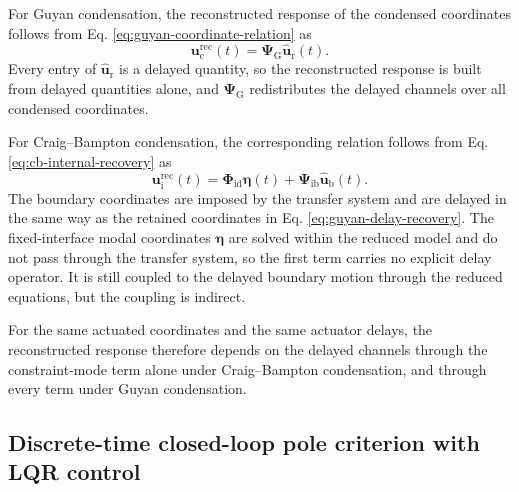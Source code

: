 \documentclass[11pt,a4paper]{article}
\numberwithin{equation}{section}
\begin{document}
For Guyan condensation, the reconstructed response of the condensed coordinates follows from Eq. \eqref{eq:guyan-coordinate-relation} as
\begin{equation}
	\bm{u}_{\mathrm{c}}^{\mathrm{rec}}(t)=\bm{\Psi}_{\mathrm{G}}\hat{\bm{u}}_{\mathrm{r}}(t).
	\label{eq:guyan-delay-recovery}
\end{equation}
Every entry of \(\hat{\bm{u}}_{\mathrm{r}}\) is a delayed quantity, so the reconstructed response is built from delayed quantities alone, and \(\bm{\Psi}_{\mathrm{G}}\) redistributes the delayed channels over all condensed coordinates.

For Craig--Bampton condensation, the corresponding relation follows from Eq. \eqref{eq:cb-internal-recovery} as
\begin{equation}
	\bm{u}_{\mathrm{i}}^{\mathrm{rec}}(t)=
	\bm{\Phi}_{\mathrm{id}}\bm{\eta}(t)
	+\bm{\Psi}_{\mathrm{ib}}\hat{\bm{u}}_{\mathrm{b}}(t).
	\label{eq:cb-delay-recovery}
\end{equation}
The boundary coordinates are imposed by the transfer system and are delayed in the same way as the retained coordinates in Eq. \eqref{eq:guyan-delay-recovery}. The fixed-interface modal coordinates \(\bm{\eta}\) are solved within the reduced model and do not pass through the transfer system, so the first term carries no explicit delay operator. It is still coupled to the delayed boundary motion through the reduced equations, but the coupling is indirect.

For the same actuated coordinates and the same actuator delays, the reconstructed response therefore depends on the delayed channels through the constraint-mode term alone under Craig--Bampton condensation, and through every term under Guyan condensation.

\subsection{Discrete-time closed-loop pole criterion with LQR control}
\label{sec:pole-criterion}
\end{document}
